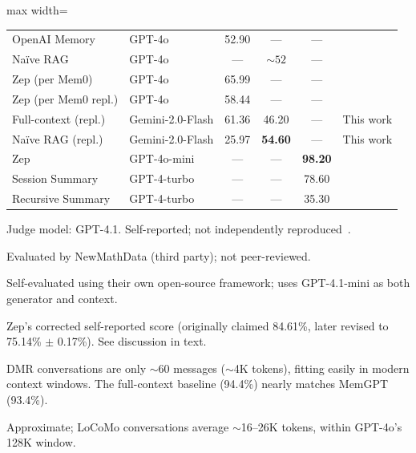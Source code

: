 \begin{table}[!t]
\begin{adjustbox}{max width=\textwidth}
\begin{threeparttable}
\begin{tabular}{@{}llcccl@{}}
OpenAI Memory        & GPT-4o            & 52.90                & ---             & ---   & \cite{choudhary2025mem0,latimer2025hindsight} \\
Na\"ive RAG          & GPT-4o            & ---                  & ${\sim}52$      & ---   & \cite{emergence2025longmemeval} \\
Zep (per Mem0)       & GPT-4o            & 65.99\tnote{g}       & ---             & ---   & \cite{choudhary2025mem0} \\
Zep (per Mem0 repl.) & GPT-4o            & 58.44\tnote{g}       & ---             & ---   & \cite{mem0replication2025} \\
\midrule
Full-context (repl.) & Gemini-2.0-Flash\tnote{h} & 61.36             & 46.20              & ---   & This work \\
Na\"ive RAG (repl.)  & Gemini-2.0-Flash\tnote{h} & 25.97             & \textbf{54.60}     & ---   & This work \\
\midrule
Zep                  & GPT-4o-mini       & ---                  & ---             & \textbf{98.20} & \cite{dempsey2025graphiti} \\
Session Summary      & GPT-4-turbo       & ---                  & ---             & 78.60 & \cite{packer2023memgpt} \\
Recursive Summary    & GPT-4-turbo       & ---                  & ---             & 35.30 & \cite{packer2023memgpt} \\
\bottomrule
\end{tabular}
\begin{tablenotes}[flushleft]\footnotesize
\item[a] Judge model: GPT-4.1.  Self-reported; not independently reproduced~\cite{latimer2025hindsight}.
\item[b] Evaluated by NewMathData (third party); not peer-reviewed.
\item[c] Self-evaluated using their own open-source framework; uses GPT-4.1-mini as both generator and context.
\item[d] Zep's corrected self-reported score (originally claimed 84.61\%, later revised to 75.14\% $\pm$ 0.17\%).  See discussion in text.
\item[e] DMR conversations are only ${\sim}60$ messages (${\sim}$4K tokens), fitting easily in modern context windows.  The full-context baseline (94.4\%) nearly matches MemGPT (93.4\%).
\item[f] Approximate; LoCoMo conversations average ${\sim}$16--26K tokens, within GPT-4o's 128K window.

\end{tablenotes}
\end{threeparttable}
\end{adjustbox}
\end{table}
